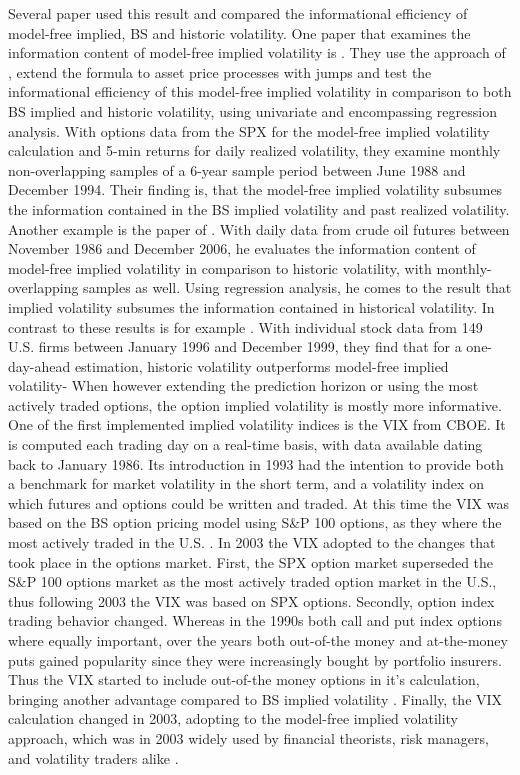 Several paper used this result and compared the informational efficiency of model-free implied, \ac{BS} and historic volatility. One paper that examines the information content of model-free implied volatility is \textcite{jiang2003}. They use the approach of \textcite{britten2000}, extend the formula to asset price processes with jumps and test the informational efficiency of this model-free implied volatility in comparison to both \ac{BS} implied and historic volatility, using univariate and encompassing regression analysis. With options data from the \ac{SPX} for the model-free implied volatility calculation and 5-min returns for daily realized volatility, they examine monthly non-overlapping samples of a 6-year sample period between June 1988 and December 1994. Their finding is, that the model-free implied volatility subsumes the information contained in the \ac{BS} implied volatility and past realized volatility. Another example is the paper of \textcite{bakanova2010}. With daily data from crude oil futures between November 1986 and December 2006, he evaluates the information content of model-free implied volatility in comparison to historic volatility, with monthly-overlapping samples as well. Using regression analysis, he comes to the result that implied volatility subsumes the information contained in historical volatility. In contrast to these results is for example \textcite{taylor2010}. With individual stock data from 149 U.S. firms between January 1996 and December 1999, they find that for a one-day-ahead estimation, historic volatility outperforms model-free implied volatility- When however extending the prediction horizon or using the most actively traded options, the option implied volatility is mostly more informative. \\
One of the first implemented implied volatility indices is the \ac{VIX} from \ac{CBOE}. It is computed each trading day on a real-time basis, with data available dating back to January 1986. Its introduction in 1993 had the intention to provide both a benchmark for market volatility in the short term, and a volatility index on which futures and options could be written and traded. At this time the \ac{VIX} was based on the \ac{BS} option pricing model using S\&P 100 options, as they where the most actively traded in the U.S. \parencite{whaley1995}. In 2003 the \ac{VIX} adopted to the changes that took place in the options market. First, the \ac{SPX} option market superseded the S\&P 100 options market as the most actively traded option market in the U.S., thus following 2003 the \ac{VIX} was based on \ac{SPX} options. Secondly, option index trading behavior changed. Whereas in the 1990s both call and put index options where equally important, over the years both out-of-the money and at-the-money puts gained popularity since they were increasingly bought by portfolio insurers. Thus the \ac{VIX} started to include out-of-the money options in it's calculation, bringing another advantage compared to \ac{BS} implied volatility \parencite{whaley2008}. Finally, the \ac{VIX} calculation changed in 2003, adopting to the model-free implied volatility approach, which was in 2003 widely used by financial theorists, risk managers, and volatility traders alike \parencite{exchange2009}.\\
